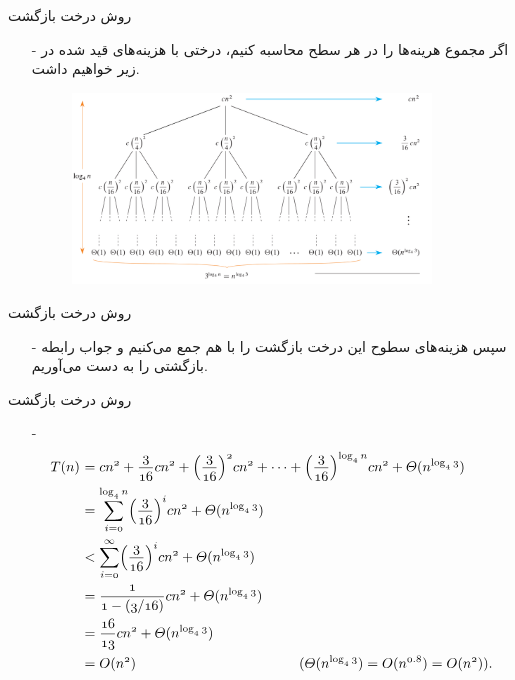 \begin{frame}{‌روش درخت بازگشت}
\begin{itemize}\itemr
\item[-]
اگر مجموع هرینه‌ها را در هر سطح محاسبه کنیم، درختی با هزینه‌های قید شده در زیر خواهیم داشت.
\begin{figure}
\includegraphics[width=0.9\textwidth]{figs/chap03/tree96-2}
\end{figure}
\end{itemize}
\end{frame}


\begin{frame}{‌روش درخت بازگشت}
\begin{itemize}\itemr
\item[-]
سپس هزینه‌های سطوح این درخت بازگشت را با هم جمع می‌کنیم و جواب رابطه بازگشتی را به دست می‌آوریم.
\end{itemize}
\end{frame}


\begin{frame}{‌روش درخت بازگشت}
\begin{itemize}\itemr
\item[-]
\begin{align*}
\mathnormal{T(n)} & \mathnormal{~= cn^2 + \frac{3}{16} cn^2 + {\left( \frac{3}{16} \right)}^2 cn^2 + \cdots +{\left( \frac{3}{16} \right)}^{\log_4 n} cn^2 + \mathnormal{\Theta(n^{\log_4 3})}}\\
& \mathnormal{~= {\sum_{i=0}^{\log_4 n}} {\left( \frac{3}{16} \right)}^i cn^2 + \mathnormal{\Theta(n^{\log_4 3})}} \\
& \mathnormal{~<  {\sum_{i=0}^{\infty}} {\left( \frac{3}{16} \right)}^i cn^2 + \mathnormal{\Theta(n^{\log_4 3})}}\\
& \mathnormal{~= \frac{1}{1 - (3/16)} cn^2 + \mathnormal{\Theta(n^{\log_4 3})}}\\
& \mathnormal{~= \frac{16}{13} cn^2 + \mathnormal{\Theta(n^{\log_4 3})}}\\
& \mathnormal{~= O(n^2)} ~~~~~~~~~~~~~~~~~~~~~~~~~~~~~~~~~~~ \mathnormal{(\mathnormal{\Theta(n^{\log_4 3})} = O(n^{0.8}) = O(n^2)).}
\end{align*}
\end{itemize}
\end{frame}
